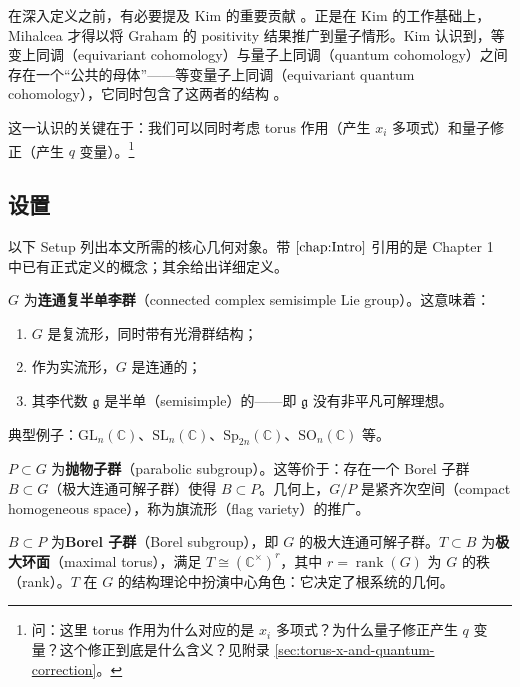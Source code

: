 在深入定义之前，有必要提及 Kim 的重要贡献 \cite{Kim2000}。正是在 Kim 的工作基础上，Mihalcea 才得以将 Graham 的 positivity 结果推广到量子情形。Kim 认识到，等变上同调（equivariant cohomology）与量子上同调（quantum cohomology）之间存在一个``公共的母体''——等变量子上同调（equivariant quantum cohomology），它同时包含了这两者的结构 \cite[\S 1]{Kim2000}。

这一认识的关键在于：我们可以同时考虑 torus 作用（产生 $x_i$ 多项式）和量子修正（产生 $q$ 变量）。\footnote{问：这里 torus 作用为什么对应的是 $x_i$ 多项式？为什么量子修正产生 $q$ 变量？这个修正到底是什么含义？见附录 \cref{sec:torus-x-and-quantum-correction}。}

\subsection{设置}

以下 Setup 列出本文所需的核心几何对象。带 $\cref{chap:Intro}$ 引用的是 Chapter 1 中已有正式定义的概念；其余给出详细定义。

\begin{Definition}
\label{def:ConnectedComplexSemisimpleLieGroup}
$G$ 为\textbf{连通复半单李群}（connected complex semisimple Lie group）。这意味着：
\begin{enumerate}
\item $G$ 是复流形，同时带有光滑群结构；
\item 作为实流形，$G$ 是连通的；
\item 其李代数 $\mathfrak{g}$ 是半单（semisimple）的——即 $\mathfrak{g}$ 没有非平凡可解理想。
\end{enumerate}
典型例子：$\mathrm{GL}_n(\mathbb{C})$、$\mathrm{SL}_n(\mathbb{C})$、$\mathrm{Sp}_{2n}(\mathbb{C})$、$\mathrm{SO}_n(\mathbb{C})$ 等。
\end{Definition}

\begin{Definition}
\label{def:ParabolicSubgroup}
$P \subset G$ 为\textbf{抛物子群}（parabolic subgroup）。这等价于：存在一个 Borel 子群 $B \subset G$（极大连通可解子群）使得 $B \subset P$。几何上，$G/P$ 是紧齐次空间（compact homogeneous space），称为旗流形（flag variety）的推广。
\end{Definition}

\begin{Definition}
\label{def:BorelAndMaximalTorus}
$B \subset P$ 为\textbf{Borel 子群}（Borel subgroup），即 $G$ 的极大连通可解子群。$T \subset B$ 为\textbf{极大环面}（maximal torus），满足 $T \cong (\mathbb{C}^\times)^r$，其中 $r = \operatorname{rank}(G)$ 为 $G$ 的秩（rank）。$T$ 在 $G$ 的结构理论中扮演中心角色：它决定了根系统的几何。
\end{Definition}

